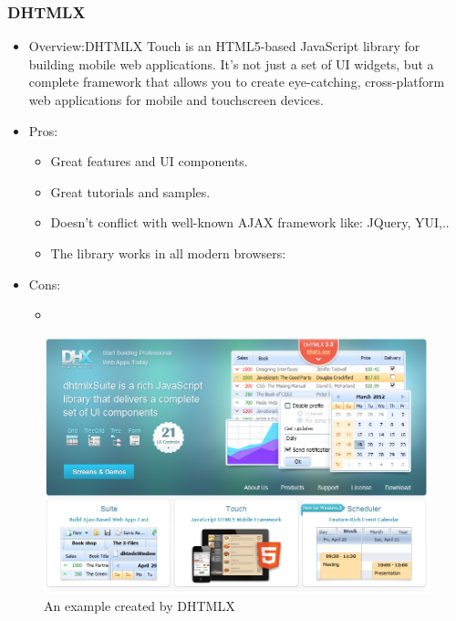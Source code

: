 \documentclass[14pt,a4paper]{extreport}
\begin{document}
			\subsubsection{DHTMLX}
			\begin{itemize}
				\item Overview:DHTMLX Touch is an HTML5-based JavaScript library for building mobile web applications. It’s not just a set of UI widgets, but a complete framework that allows you to create eye-catching, cross-platform web applications for mobile and touchscreen devices.
				\item Pros: 
					\begin{itemize}
						\item Great features and UI components.
						\item Great tutorials and samples.
						\item Doesn't conflict with well-known AJAX framework like: JQuery, YUI,..
						\item The library works in all modern browsers: 
						
					\end{itemize}
				\item Cons:
					\begin{itemize}
						\item
					
					\end{itemize}
			\end{itemize}
			\begin{figure}
				\begin{center}
				\includegraphics[scale=0.7]{dhtmlx.png}
				\caption{An example created by DHTMLX}
				\end{center}			
			\end{figure}
\end{document}
